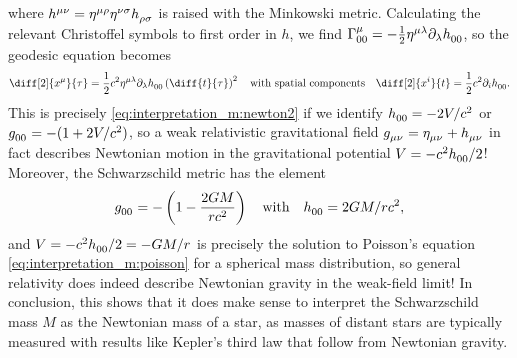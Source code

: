 where $h\indices{^\mu^\nu} = \eta\indices{^\mu^\rho} \eta\indices{^\nu^\sigma} h\indices{_\rho_\sigma}$ is raised with the Minkowski metric.
Calculating the relevant Christoffel symbols to first order in $h$, we find $\Gamma^\mu_{00} = -\frac{1}{2} \eta\indices{^\mu^\lambda} \partial_\lambda h\indices{_0_0}$, so the geodesic equation becomes
\begin{equation*}
	\diff[2]{x^\mu}{\tau} = \frac{1}{2} c^2 \eta\indices{^\mu^\lambda} \partial_\lambda h\indices{_0_0} \left( \diff{t}{\tau} \right)^2
	\quad \text{with spatial components} \quad
	\diff[2]{x^i}{t} = \frac{1}{2} c^2 \partial_i h\indices{_0_0} .
\end{equation*}
This is precisely \cref{eq:interpretation_m:newton2} if we identify $h\indices{_0_0} = -2V/c^2$ or $g\indices{_0_0} = -(1+2V/c^2)$, so a weak relativistic gravitational field $g\indices{_\mu_\nu} = \eta\indices{_\mu_\nu} + h\indices{_\mu_\nu}$ in fact describes Newtonian motion in the gravitational potential $V = -c^2 h\indices{_0_0} / 2$!
Moreover, the Schwarzschild metric has the element
\begin{equation}
	g\indices{_0_0} = - \left( 1 - \frac{2 G M}{r c^2} \right)
	\quad \text{with} \quad
	h\indices{_0_0} = 2GM/rc^2 ,
	\label{eq:weak_field_limit:schwarzschild_metric_tt}
\end{equation}
and $V = -c^2 h\indices{_0_0} / 2 = -G M / r$ is precisely the solution to Poisson's equation \eqref{eq:interpretation_m:poisson} for a spherical mass distribution, so general relativity does indeed describe Newtonian gravity in the weak-field limit!
In conclusion, this shows that it does make sense to interpret the Schwarzschild mass $M$ as the Newtonian mass of a star, as masses of distant stars are typically measured with results like Kepler's third law that follow from Newtonian gravity. \cite[box 23.1]{ref:mtw}

